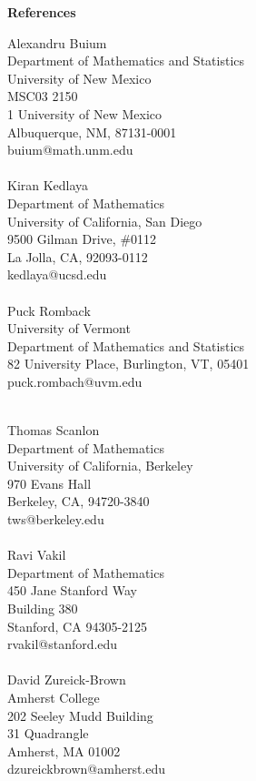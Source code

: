 \documentclass[a4paper,10pt]{article}
\begin{document}
\noindent \textbf{\Large{References}}
\begin{multicols}{2}
	\begin{flushleft}
		Alexandru Buium\\
		Department of Mathematics and Statistics\\
		University of New Mexico\\
		MSC03 2150\\
		1 University of New Mexico\\
		Albuquerque, NM, 87131-0001\\
		buium@math.unm.edu\\ \ \\
	
		Kiran Kedlaya\\
		Department of Mathematics\\
		University of California, San Diego\\
		9500 Gilman Drive, \#0112\\
		La Jolla, CA, 92093-0112\\
		kedlaya@ucsd.edu \\ \ \\
		
		Puck Romback \\
		University of Vermont \\
		Department of Mathematics and Statistics \\
		82 University Place, Burlington, VT, 05401  \\ 
		puck.rombach@uvm.edu \\  \ \\
\end{flushleft}



\begin{flushleft}
	Thomas Scanlon\\
Department of Mathematics\\
University of California, Berkeley\\
970 Evans Hall\\
Berkeley, CA, 94720-3840\\
tws@berkeley.edu \\ \ \\


	Ravi Vakil\\
	Department of Mathematics\\
	450 Jane Stanford Way\\
	Building 380\\
	Stanford, CA 94305-2125\\
	rvakil@stanford.edu\\ \ \\

	David Zureick-Brown \\
	Amherst College \\
	202 Seeley Mudd Building\\
	31 Quadrangle\\
	Amherst, MA 01002\\
	dzureickbrown@amherst.edu\\
	 \ \\ \ \\ 
\end{flushleft}


\end{multicols}
\end{document}

